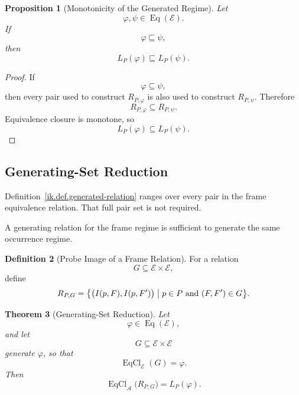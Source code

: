 \documentclass[11pt]{article}
\theoremstyle{plain}
\newtheorem{theorem}{Theorem}[section]
\newtheorem{proposition}[theorem]{Proposition}
\theoremstyle{definition}
\newtheorem{definition}[theorem]{Definition}
\theoremstyle{remark}
\begin{document}
\begin{proposition}[Monotonicity of the Generated Regime]
  \label{ik.prop.generated-monotone}
  Let
  \[
    \varphi,\psi
    \in
    \operatorname{Eq}(\mathcal{E}).
  \]
  If
  \[
    \varphi
    \sqsubseteq
    \psi,
  \]
  then
  \[
    L_P(\varphi)
    \sqsubseteq
    L_P(\psi).
  \]
\end{proposition}

\begin{proof}
  If
  \[
    \varphi
    \subseteq
    \psi,
  \]
  then every pair used to construct
  \(R_{P,\varphi}\)
  is also used to construct
  \(R_{P,\psi}\).
  Therefore
  \[
    R_{P,\varphi}
    \subseteq
    R_{P,\psi}.
  \]
  Equivalence closure is monotone,
  so
  \[
    L_P(\varphi)
    \subseteq
    L_P(\psi).
  \]
\end{proof}

\subsection{Generating-Set Reduction}

Definition~\ref{ik.def.generated-relation}
ranges over every pair in the frame equivalence relation.
That full pair set is not required.

A generating relation for the frame regime
is sufficient to generate the same occurrence regime.

\begin{definition}[Probe Image of a Frame Relation]
  \label{ik.def.relation-image}
  For a relation
  \[
    G
    \subseteq
    \mathcal{E}\times\mathcal{E},
  \]
  define
  \[
    R_{P,G}
    =
    \bigl\{
    \bigl(
    I(p,F),
    I(p,F')
    \bigr)
    \bigm|
    p\in P
    \text{ and }
    (F,F')\in G
    \bigr\}.
  \]
\end{definition}

\begin{theorem}[Generating-Set Reduction]
  \label{ik.thm.generating-reduction}
  Let
  \[
    \varphi
    \in
    \operatorname{Eq}(\mathcal{E}),
  \]
  and let
  \[
    G
    \subseteq
    \mathcal{E}\times\mathcal{E}
  \]
  generate \(\varphi\), so that
  \[
    \operatorname{EqCl}_{\mathcal{E}}(G)
    =
    \varphi.
  \]
  Then
  \[
    \operatorname{EqCl}_{\mathcal{A}}
    \bigl(
    R_{P,G}
    \bigr)
    =
    L_P(\varphi).
  \]
\end{theorem}
\end{document}
